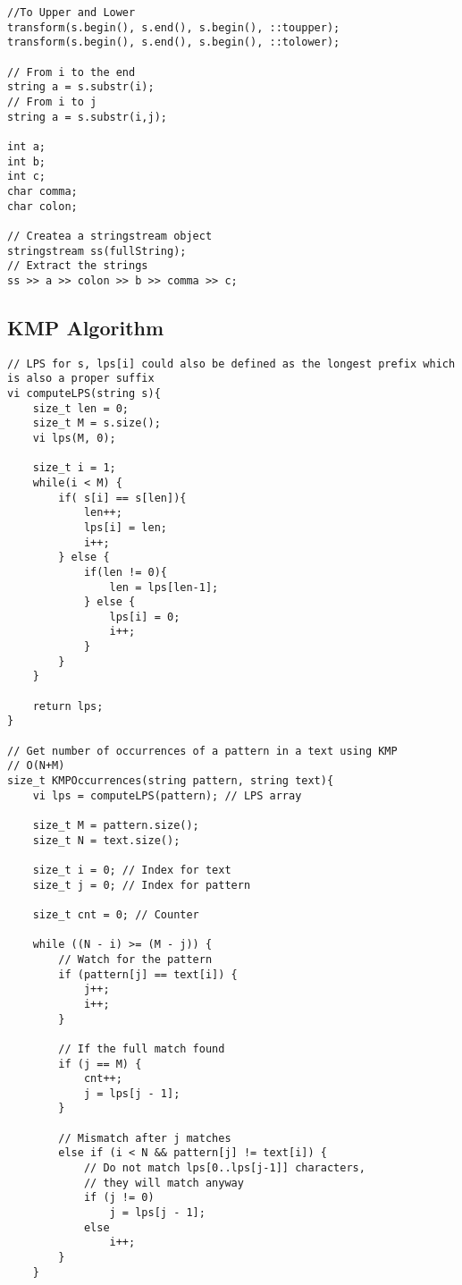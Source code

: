 \documentclass[10pt]{article}
\begin{document}
\begin{multicols*}{2}
\begin{lstlisting}[style=compactcpp]
//To Upper and Lower
transform(s.begin(), s.end(), s.begin(), ::toupper);
transform(s.begin(), s.end(), s.begin(), ::tolower);

// From i to the end
string a = s.substr(i);
// From i to j
string a = s.substr(i,j);

int a;
int b;
int c;
char comma;
char colon;

// Createa a stringstream object
stringstream ss(fullString);
// Extract the strings
ss >> a >> colon >> b >> comma >> c;

\end{lstlisting}

\subsection{KMP Algorithm}
\begin{lstlisting}[style=compactcpp]
// LPS for s, lps[i] could also be defined as the longest prefix which is also a proper suffix
vi computeLPS(string s){
    size_t len = 0;
    size_t M = s.size();
    vi lps(M, 0);

    size_t i = 1;
    while(i < M) {
        if( s[i] == s[len]){
            len++;
            lps[i] = len;
            i++;
        } else {
            if(len != 0){
                len = lps[len-1];
            } else {
                lps[i] = 0;
                i++;
            }
        }
    }

    return lps;
}

// Get number of occurrences of a pattern in a text using KMP
// O(N+M)
size_t KMPOccurrences(string pattern, string text){
    vi lps = computeLPS(pattern); // LPS array

    size_t M = pattern.size();
    size_t N = text.size();

    size_t i = 0; // Index for text
    size_t j = 0; // Index for pattern

    size_t cnt = 0; // Counter

    while ((N - i) >= (M - j)) {
        // Watch for the pattern
        if (pattern[j] == text[i]) {
            j++;
            i++;
        }

        // If the full match found
        if (j == M) {
            cnt++;
            j = lps[j - 1];
        }

        // Mismatch after j matches
        else if (i < N && pattern[j] != text[i]) {
            // Do not match lps[0..lps[j-1]] characters,
            // they will match anyway
            if (j != 0)
                j = lps[j - 1];
            else
                i++;
        }
    }


\end{lstlisting}
\end{multicols*}
\end{document}
